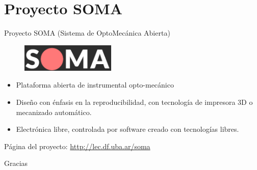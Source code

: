\documentclass{beamer}
\begin{document}
    \section{Proyecto SOMA}
        \begin{frame}{Proyecto SOMA (Sistema de OptoMecánica Abierta)}
            \centering
            \begin{figure}[H]
                \centering
                \includegraphics[width=0.4\textwidth]{fig/proyecto_soma}
                \label{fig:soma}
            \end{figure}
            \begin{itemize}
                \item Plataforma abierta de instrumental opto-mecánico
                \item Diseño con énfasis en la reproducibilidad, con tecnología de impresora 3D o mecanizado automático.
                \item Electrónica libre, controlada por software creado con tecnologías libres.
            \end{itemize}
            Página del proyecto: \url{http://lec.df.uba.ar/soma}
        \end{frame}

        \begin{frame}[plain]{}
            \centering
            \Huge
            Gracias
        \end{frame}
\end{document}

